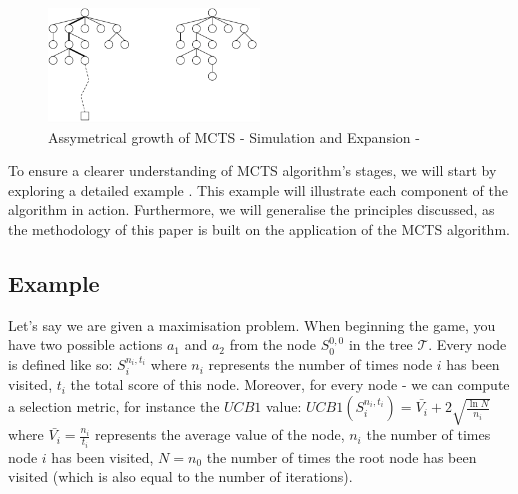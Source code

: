 \begin{figure}[!ht]
    \centering
    \includegraphics[width=0.5\textwidth]{Figures/assymetric_growth_mcts_tree.png}
    \caption{Assymetrical growth of MCTS - Simulation and Expansion - \cite{mcts_assymetrical_growth}}
    \label{fig:Assymetrical_growth_MCTS}
\end{figure}
\newpage
To ensure a clearer understanding of MCTS algorithm's stages, we will start by exploring a detailed example \cite{example_youtube_mcts}. This example will illustrate each component of the algorithm in action. Furthermore, we will generalise the principles discussed, as the methodology of this paper is built on the application of the MCTS algorithm.


\subsection{Example}
\label{subsub:Example}
Let's say we are given a maximisation problem. When beginning the game, you have two possible actions $a_1$ and $a_2$ from the node $S^{0,0}_0$ in the tree $\mathcal{T}$.
Every node is defined like so: $S^{n_i,t_i}_i$ where $n_i$ represents the number of times node $i$ has been visited, $t_i$ the total score of this node.
Moreover, for every node - we can compute a selection metric, for instance the $UCB1$ value: $UCB1(S^{n_i,t_i}_i)=\bar{V_i} + 2 \sqrt{\frac{\ln N}{n_i}}$ where $\bar{V_i}=\frac{n_i}{t_i}$ represents the average value of the node, $n_i$ the number of times node $i$ has been visited, $N=n_0$ the number of times the root node has been visited (which is also equal to the number of iterations).

